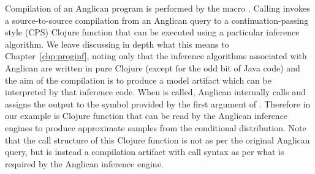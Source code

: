 Compilation of an Anglican program is performed by the macro \query.  Calling \query
invokes a source-to-source compilation from an Anglican query to a continuation-passing 
style (CPS) Clojure function that can be executed using a particular inference algorithm.  We
leave discussing in depth what this means to Chapter~\ref{chp:proginf}, noting only that
the inference algorithms associated with Anglican are written in pure Clojure (except for the odd
bit of Java code) and the aim of the compilation is to produce a model artifact which can be
interpreted by that inference code.
When  is called, Anglican internally calls \query and assigns the output to
the symbol provided by the first argument of .  Therefore {\small {}} in
our example is Clojure function that can be read by the Anglican inference engines to produce
approximate samples from the conditional distribution.  Note that the call structure of this Clojure
function is not as per the original Anglican query, but is instead a compilation artifact with
call syntax as per what is required by the Anglican inference engine.

